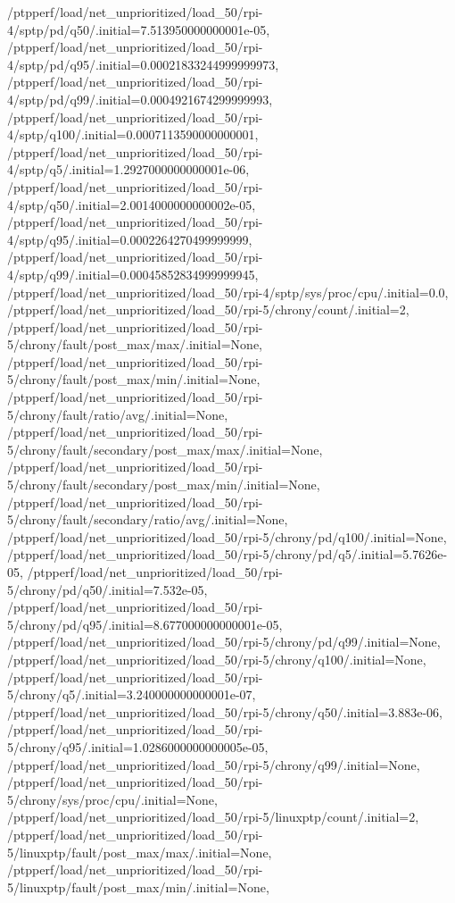 {    /ptpperf/load/net_unprioritized/load_50/rpi-4/sptp/pd/q50/.initial=7.513950000000001e-05,
    /ptpperf/load/net_unprioritized/load_50/rpi-4/sptp/pd/q95/.initial=0.00021833244999999973,
    /ptpperf/load/net_unprioritized/load_50/rpi-4/sptp/pd/q99/.initial=0.0004921674299999993,
    /ptpperf/load/net_unprioritized/load_50/rpi-4/sptp/q100/.initial=0.0007113590000000001,
    /ptpperf/load/net_unprioritized/load_50/rpi-4/sptp/q5/.initial=1.2927000000000001e-06,
    /ptpperf/load/net_unprioritized/load_50/rpi-4/sptp/q50/.initial=2.0014000000000002e-05,
    /ptpperf/load/net_unprioritized/load_50/rpi-4/sptp/q95/.initial=0.0002264270499999999,
    /ptpperf/load/net_unprioritized/load_50/rpi-4/sptp/q99/.initial=0.00045852834999999945,
    /ptpperf/load/net_unprioritized/load_50/rpi-4/sptp/sys/proc/cpu/.initial=0.0,
    /ptpperf/load/net_unprioritized/load_50/rpi-5/chrony/count/.initial=2,
    /ptpperf/load/net_unprioritized/load_50/rpi-5/chrony/fault/post_max/max/.initial=None,
    /ptpperf/load/net_unprioritized/load_50/rpi-5/chrony/fault/post_max/min/.initial=None,
    /ptpperf/load/net_unprioritized/load_50/rpi-5/chrony/fault/ratio/avg/.initial=None,
    /ptpperf/load/net_unprioritized/load_50/rpi-5/chrony/fault/secondary/post_max/max/.initial=None,
    /ptpperf/load/net_unprioritized/load_50/rpi-5/chrony/fault/secondary/post_max/min/.initial=None,
    /ptpperf/load/net_unprioritized/load_50/rpi-5/chrony/fault/secondary/ratio/avg/.initial=None,
    /ptpperf/load/net_unprioritized/load_50/rpi-5/chrony/pd/q100/.initial=None,
    /ptpperf/load/net_unprioritized/load_50/rpi-5/chrony/pd/q5/.initial=5.7626e-05,
    /ptpperf/load/net_unprioritized/load_50/rpi-5/chrony/pd/q50/.initial=7.532e-05,
    /ptpperf/load/net_unprioritized/load_50/rpi-5/chrony/pd/q95/.initial=8.677000000000001e-05,
    /ptpperf/load/net_unprioritized/load_50/rpi-5/chrony/pd/q99/.initial=None,
    /ptpperf/load/net_unprioritized/load_50/rpi-5/chrony/q100/.initial=None,
    /ptpperf/load/net_unprioritized/load_50/rpi-5/chrony/q5/.initial=3.240000000000001e-07,
    /ptpperf/load/net_unprioritized/load_50/rpi-5/chrony/q50/.initial=3.883e-06,
    /ptpperf/load/net_unprioritized/load_50/rpi-5/chrony/q95/.initial=1.0286000000000005e-05,
    /ptpperf/load/net_unprioritized/load_50/rpi-5/chrony/q99/.initial=None,
    /ptpperf/load/net_unprioritized/load_50/rpi-5/chrony/sys/proc/cpu/.initial=None,
    /ptpperf/load/net_unprioritized/load_50/rpi-5/linuxptp/count/.initial=2,
    /ptpperf/load/net_unprioritized/load_50/rpi-5/linuxptp/fault/post_max/max/.initial=None,
    /ptpperf/load/net_unprioritized/load_50/rpi-5/linuxptp/fault/post_max/min/.initial=None,
}
